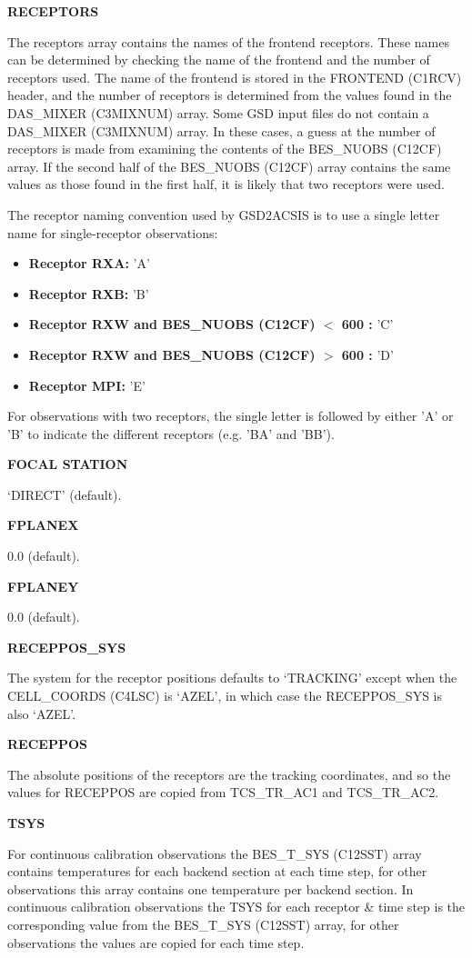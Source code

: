 \documentclass[twoside,11pt,nolof]{starlink}
\providecommand{\cellCoords}{CELL\_COORDS (C4LSC)}
\providecommand{\frontend}{FRONTEND (C1RCV)}
\providecommand{\mixNums}{DAS\_MIXER (C3MIXNUM)}
\providecommand{\centreFreqs}{BES\_NUOBS (C12CF)}
\providecommand{\sourceSysTemps}{BES\_T\_SYS (C12SST)}
\begin{document}
\textbf{RECEPTORS}

The receptors array contains the names of the frontend receptors.  These names can be determined by checking the name of the frontend and the number of receptors used.  The name of the frontend is stored in the \frontend{} header, and the number of receptors is determined from the values found in the \mixNums{} array.  Some GSD input files do not contain a \mixNums{} array.  In these cases, a guess at the number of receptors is made from examining the contents of the \centreFreqs{} array.  If the second half of the \centreFreqs{} array contains the same values as those found in the first half, it is likely that two receptors were used.

The receptor naming convention used by GSD2ACSIS is to use a single letter name for single-receptor observations:

\begin{itemize}
\item \textbf{Receptor RXA:} 'A'
\item \textbf{Receptor RXB:} 'B'
\item \textbf{Receptor RXW and \centreFreqs{} $<$ 600 :} 'C'
\item \textbf{Receptor RXW and \centreFreqs{} $>$ 600 :} 'D'
\item \textbf{Receptor MPI:} 'E'
\end{itemize}

For observations with two receptors, the single letter is followed by either 'A' or 'B' to indicate the different receptors (e.g. 'BA' and 'BB').

\textbf{FOCAL STATION}

`DIRECT' (default).

\textbf{FPLANEX}

0.0 (default).

\textbf{FPLANEY}

0.0 (default).

\textbf{RECEPPOS\_SYS}

The system for the receptor positions defaults to `TRACKING' except when the \cellCoords{} is `AZEL', in which case the RECEPPOS\_SYS is also `AZEL'.

\textbf{RECEPPOS}

The absolute positions of the receptors are the tracking coordinates, and so the values for RECEPPOS are copied from TCS\_TR\_AC1 and TCS\_TR\_AC2.

\textbf{TSYS}

For continuous calibration observations the \sourceSysTemps{} array contains temperatures for each backend section at each time step, for other observations this array contains one temperature per backend section.  In continuous calibration observations the TSYS for each receptor \& time step is the corresponding value from the \sourceSysTemps{} array, for other observations the values are copied for each time step.
\end{document}
